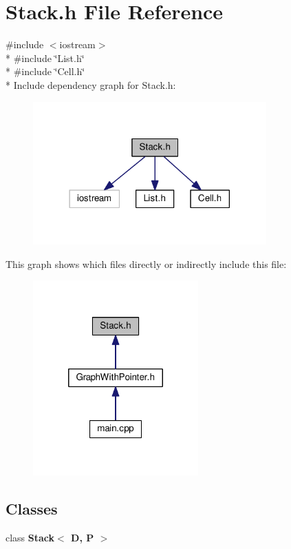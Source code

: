 \section{Stack.\-h File Reference}
\label{_stack_8h}
{\ttfamily \#include $<$iostream$>$}\\*
{\ttfamily \#include \char`\"{}List.\-h\char`\"{}}\\*
{\ttfamily \#include \char`\"{}Cell.\-h\char`\"{}}\\*
Include dependency graph for Stack.\-h\-:
\nopagebreak
\begin{figure}[H]
\begin{center}
\leavevmode
\includegraphics[width=254pt]{_stack_8h__incl}
\end{center}
\end{figure}
This graph shows which files directly or indirectly include this file\-:
\nopagebreak
\begin{figure}[H]
\begin{center}
\leavevmode
\includegraphics[width=180pt]{_stack_8h__dep__incl}
\end{center}
\end{figure}
\subsection*{Classes}
\begin{DoxyCompactItemize}
\item 
class {\bf Stack$<$ D, P $>$}
\end{DoxyCompactItemize}
